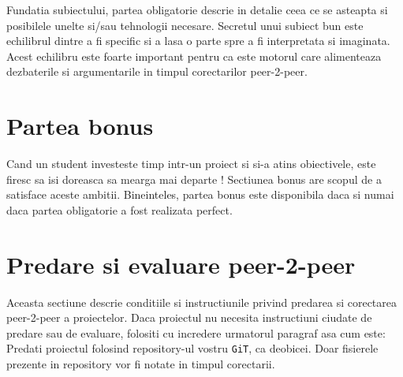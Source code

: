 \documentclass{42-en}
\begin{document}
    Fundatia subiectului, partea obligatorie descrie in detalie ceea ce
    se asteapta si posibilele unelte si/sau tehnologii necesare.
    Secretul unui subiect bun este echilibrul dintre a fi specific
    si a lasa o parte spre a fi interpretata si imaginata.
    Acest echilibru este foarte important pentru ca este motorul
    care alimenteaza dezbaterile si argumentarile in timpul corectarilor peer-2-peer.



\chapter{Partea bonus}

    Cand un student investeste timp intr-un proiect si si-a atins obiectivele,
    este firesc sa isi doreasca sa mearga mai departe ! Sectiunea bonus are
    scopul de a satisface aceste ambitii. Bineinteles, partea bonus este disponibila 
    daca si numai daca partea obligatorie a fost realizata perfect.



\chapter{Predare si evaluare peer-2-peer}

    Aceasta sectiune descrie conditiile si instructiunile privind predarea si
    corectarea peer-2-peer a proiectelor. Daca proiectul nu necesita
    instructiuni ciudate de predare sau de evaluare, folositi cu incredere
    urmatorul paragraf asa cum este:\\

    Predati proiectul folosind repository-ul vostru \texttt{GiT}, ca deobicei.
    Doar fisierele prezente in repository vor fi notate in timpul corectarii.



\end{document}
